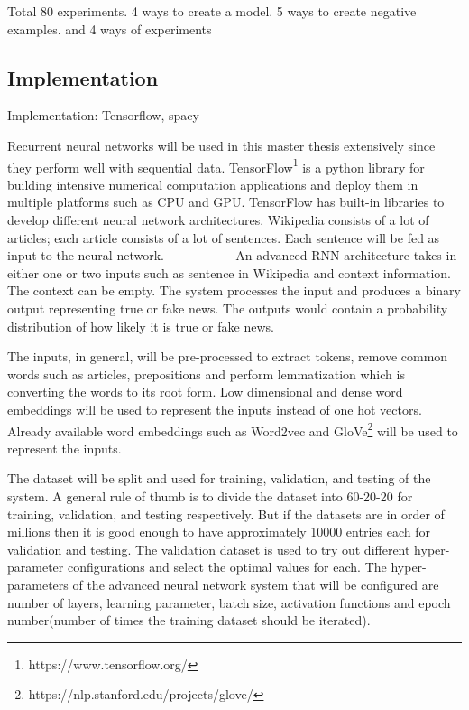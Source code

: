 \documentclass[a4paper, 11pt]{article}
\begin{document}
Total 80 experiments. 4 ways to create a model. 5 ways to create negative examples. and 4 ways of experiments

\subsection{Implementation}

Implementation: Tensorflow, spacy 

Recurrent neural networks will be used in this master thesis extensively since they perform well with sequential data. TensorFlow\footnote{https://www.tensorflow.org/} is a python library for building intensive numerical computation applications and deploy them in multiple platforms such as CPU and GPU. TensorFlow has built-in libraries to develop different neural network architectures. Wikipedia consists of a lot of articles; each article consists of a lot of sentences. Each sentence will be fed as input to the neural network.
---------------
An advanced RNN architecture takes in either one or two inputs such as sentence in Wikipedia and context information. The context can be empty. The system processes the input and produces a binary output representing true or fake news. The outputs would contain a probability distribution of how likely it is true or fake news.

The inputs, in general, will be pre-processed to extract tokens, remove common words such as articles, prepositions and perform lemmatization which is converting the words to its root form. Low dimensional and dense word embeddings will be used to represent the inputs instead of one hot vectors. Already available word embeddings such as Word2vec \parencite{Mikolov2013} and GloVe\footnote{https://nlp.stanford.edu/projects/glove/} will be used to represent the inputs.

The dataset will be split and used for training, validation, and testing of the system. A general rule of thumb is to divide the dataset into 60-20-20 for training, validation, and testing respectively. But if the datasets are in order of millions then it is good enough to have approximately 10000 entries each for validation and testing. The validation dataset is used to try out different hyper-parameter configurations and select the optimal values for each. The hyper-parameters of the advanced neural network system that will be configured are number of layers, learning parameter, batch size, activation functions and epoch number(number of times the training dataset should be iterated).
\end{document}
